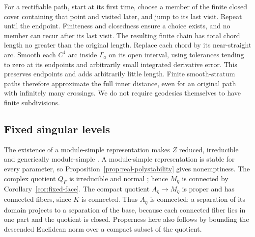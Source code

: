 For a rectifiable path, start at its first time, choose a member
of the finite closed cover containing that point and visited later,
and jump to its last visit. Repeat until the endpoint. Finiteness
and closedness ensure a choice exists, and no member can recur
after its last visit. The resulting finite chain has total chord
length no greater than the original length. Replace each chord by
its near-straight arc. Smooth each $C^1$ arc inside $\Gamma_a$ on
its open interval, using tolerances tending to zero at its endpoints
and arbitrarily small integrated derivative error.
This preserves endpoints and adds arbitrarily little length.
Finite smooth-stratum paths therefore approximate the full inner
distance, even for an original path with infinitely many crossings.
We do not require geodesics themselves to have finite subdivisions.

\subsection{Fixed singular levels}
The existence of a module-simple representation makes $Z$ reduced, irreducible and
generically module-simple \cite[Theorem~1.2]{CB01}.
A module-simple representation is stable for every parameter,
so Proposition~\ref{prop:real-polystability} gives nonemptiness.
The complex quotient $Q_F$ is irreducible and normal
\cite[Proposition~3.21]{BeSc24}; hence $M_\eta$ is connected by
Corollary~\ref{cor:fixed-face}. The compact quotient
$A_\eta\to M_\eta$ is proper and has connected fibers, since $K$
is connected. Thus $A_\eta$ is connected: a separation of its
domain projects to a separation of the base, because each connected
fiber lies in one part and the quotient is closed.
Properness here also follows by bounding the descended Euclidean
norm over a compact subset of the quotient.

